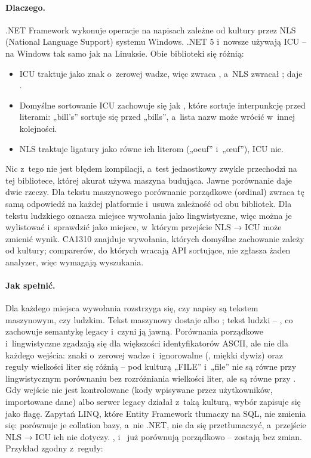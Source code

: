 \paragraph{Dlaczego.} .NET Framework wykonuje operacje na napisach zależne od kultury przez
NLS (National Language Support) systemu Windows. .NET 5 i~nowsze używają ICU -- na Windows
tak samo jak na Linuksie. Obie biblioteki się różnią:
\begin{itemize}
  \item ICU traktuje  jako znak o~zerowej wadze, więc
         zwraca , a~NLS zwracał ;
         daje .
  \item Domyślne sortowanie ICU zachowuje się jak , które
        sortuje interpunkcję przed literami: „bill's” sortuje się przed „bills”, a~lista nazw
        może wrócić w~innej kolejności.
  \item NLS traktuje ligatury jako równe ich literom („oeuf” i~„œuf”), ICU nie.
\end{itemize}
Nic z~tego nie jest błędem kompilacji, a~test jednostkowy zwykle przechodzi na tej
bibliotece, której akurat używa maszyna budująca. Jawne porównanie daje dwie rzeczy. Dla
tekstu maszynowego porównanie porządkowe (ordinal) zwraca tę samą odpowiedź na każdej
platformie i~usuwa zależność od obu bibliotek. Dla tekstu ludzkiego oznacza miejsce wywołania
jako lingwistyczne, więc można je wylistować i~sprawdzić jako miejsce, w~którym przejście
NLS → ICU może zmienić wynik. CA1310 znajduje wywołania, których domyślne zachowanie zależy
od kultury; comparerów, do których wracają API sortujące, nie zgłasza żaden analyzer, więc
wymagają wyszukania.

\paragraph{Jak spełnić.} Dla każdego miejsca wywołania rozstrzyga się, czy napisy są tekstem
maszynowym, czy ludzkim. Tekst maszynowy dostaje  albo
; tekst ludzki -- , co zachowuje
semantykę legacy i~czyni ją jawną. Porównania porządkowe i~lingwistyczne zgadzają się dla
większości identyfikatorów ASCII, ale nie dla każdego wejścia: znaki o~zerowej wadze
i~ignorowalne (, miękki dywiz) oraz reguły wielkości liter się
różnią -- pod kulturą  „FILE” i~„file” nie są równe przy lingwistycznym
porównaniu bez rozróżniania wielkości liter, ale są równe przy .
Gdy wejście nie jest kontrolowane (kody wpisywane przez użytkowników, importowane dane) albo
serwer legacy działał z~taką kulturą, wybór zapisuje się jako flagę. Zapytań LINQ, które
Entity Framework tłumaczy na SQL, nie zmienia się: porównuje je collation bazy, a~nie .NET,
 nie da się przetłumaczyć, a~przejście NLS → ICU ich nie dotyczy.
,  i~
już porównują porządkowo -- zostają bez zmian. Przykład zgodny z~reguły:

